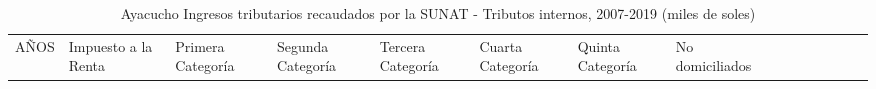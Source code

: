 \documentclass[
  jou,
  floatsintext,
  longtable,
  a4paper,
  nolmodern,
  notxfonts,
  notimes,
  12pt,
  colorlinks=true,linkcolor=blue,citecolor=blue,urlcolor=blue]{apa7}
\begin{document}
\begin{ThreePartTable}
\begin{longtable}[]{@{}
  >{\raggedright\arraybackslash}p{}
  >{\raggedright\arraybackslash}p{}
  >{\raggedright\arraybackslash}p{}
  >{\raggedright\arraybackslash}p{}
  >{\raggedright\arraybackslash}p{}
  >{\raggedright\arraybackslash}p{}
  >{\raggedright\arraybackslash}p{}
  >{\raggedright\arraybackslash}p{}
  >{\raggedright\arraybackslash}p{}
  >{\raggedright\arraybackslash}p{}
  >{\raggedright\arraybackslash}p{}
  >{\raggedright\arraybackslash}p{}
  >{\raggedright\arraybackslash}p{}
  >{\raggedright\arraybackslash}p{}
  >{\raggedright\arraybackslash}p{}@{}}
\caption{Ayacucho Ingresos tributarios recaudados por la SUNAT -
Tributos internos, 2007-2019 (miles de
soles)}\label{tbl-2}\tabularnewline
\toprule\noalign{}
\begin{minipage}[b]{\linewidth}\raggedright
AÑOS
\end{minipage} & \begin{minipage}[b]{\linewidth}\raggedright
Impuesto a la Renta
\end{minipage} & \begin{minipage}[b]{\linewidth}\raggedright
Primera Categoría
\end{minipage} & \begin{minipage}[b]{\linewidth}\raggedright
Segunda Categoría
\end{minipage} & \begin{minipage}[b]{\linewidth}\raggedright
Tercera Categoría
\end{minipage} & \begin{minipage}[b]{\linewidth}\raggedright
Cuarta Categoría
\end{minipage} & \begin{minipage}[b]{\linewidth}\raggedright
Quinta Categoría
\end{minipage} & \begin{minipage}[b]{\linewidth}\raggedright
No domiciliados

\end{minipage}
\end{longtable}
\end{ThreePartTable}
\end{document}
